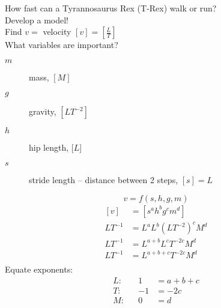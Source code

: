 \documentclass[
	date={August 26{,} 2024}
]{math486notes}
\begin{document}
\begin{example}
	How fast can a Tyrannosaurus Rex (T-Rex) walk or run?\\
	Develop a model!\\
	Find $v=$ velocity $[v] = \left[ \frac{L}{T} \right]$\\
	What variables are important?
	\begin{description}
		\item[$m$] mass, $[M]$
		\item[$g$] gravity, $[LT^{-2}]$
		\item[$h$] hip length, [$L$]
		\item[$s$] stride length -- distance between 2 steps, $[s]=L$
	\end{description}
	\[ v = f(s, h, g, m) \]
	\begin{equation*}
	\begin{aligned}
		[v] &= [s^{a}h^{b}g^{c}m^{d}]\\
		LT^{-1} &= L^{a}L^{b}\left( LT^{-2} \right)^{c}M^{d}\\
		LT^{-1} &= L^{a+b}L^{c}T^{-2c}M^{d}\\
		LT^{-1} &= L^{a+b+c}T^{-2c}M^{d}\\
	\end{aligned}
	\end{equation*}
	Equate exponents:
	\begin{equation*}
	\begin{aligned}
		L:&& 1 &= a + b + c\\
		T{:}&& -1 &= -2c\\
		M:&& 0 &= d\\
	\end{aligned}
	\end{equation*}

\end{example}
\end{document}
